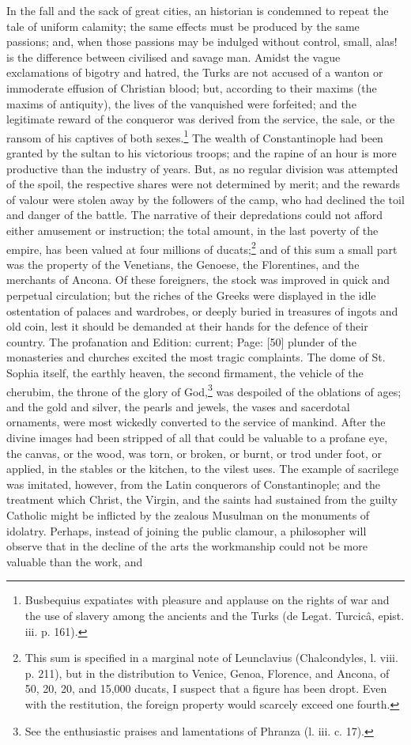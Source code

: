 In the fall and the sack of great cities, an historian is condemned to repeat the tale of uniform calamity; the same effects must be produced by the same passions; and, when those passions may be indulged without control, small, alas! is the difference between civilised and savage man. Amidst the vague exclamations of bigotry and hatred, the Turks are not accused of a wanton or immoderate effusion of Christian blood; but, according to their maxims (the maxims of antiquity), the lives of the vanquished were forfeited; and the legitimate reward of the conqueror was derived from the service, the sale, or the ransom of his captives of both sexes.\footnote{Busbequius expatiates with pleasure and applause on the rights of war and the use of slavery among the ancients and the Turks (de Legat. Turcicâ, epist. iii. p. 161).} The wealth of Constantinople had been granted by the sultan to his victorious troops; and the rapine of an hour is more productive than the industry of years. But, as no regular division was attempted of the spoil, the respective shares were not determined by merit; and the rewards of valour were stolen away by the followers of the camp, who had declined the toil and danger of the battle. The narrative of their depredations could not afford either amusement or instruction; the total amount, in the last poverty of the empire, has been valued at four millions of ducats;\footnote{This sum is specified in a marginal note of Leunclavius (Chalcondyles, l. viii. p. 211), but in the distribution to Venice, Genoa, Florence, and Ancona, of 50, 20, 20, and 15,000 ducats, I suspect that a figure has been dropt. Even with the restitution, the foreign property would scarcely exceed one fourth.} and of this sum a small part was the property of the Venetians, the Genoese, the Florentines, and the merchants of Ancona. Of these foreigners, the stock was improved in quick and perpetual circulation; but the riches of the Greeks were displayed in the idle ostentation of palaces and wardrobes, or deeply buried in treasures of ingots and old coin, lest it should be demanded at their hands for the defence of their country. The profanation and Edition: current; Page: [50] plunder of the monasteries and churches excited the most tragic complaints. The dome of St. Sophia itself, the earthly heaven, the second firmament, the vehicle of the cherubim, the throne of the glory of God,\footnote{See the enthusiastic praises and lamentations of Phranza (l. iii. c. 17).} was despoiled of the oblations of ages; and the gold and silver, the pearls and jewels, the vases and sacerdotal ornaments, were most wickedly converted to the service of mankind. After the divine images had been stripped of all that could be valuable to a profane eye, the canvas, or the wood, was torn, or broken, or burnt, or trod under foot, or applied, in the stables or the kitchen, to the vilest uses. The example of sacrilege was imitated, however, from the Latin conquerors of Constantinople; and the treatment which Christ, the Virgin, and the saints had sustained from the guilty Catholic might be inflicted by the zealous Musulman on the monuments of idolatry. Perhaps, instead of joining the public clamour, a philosopher will observe that in the decline of the arts the workmanship could not be more valuable than the work, and 